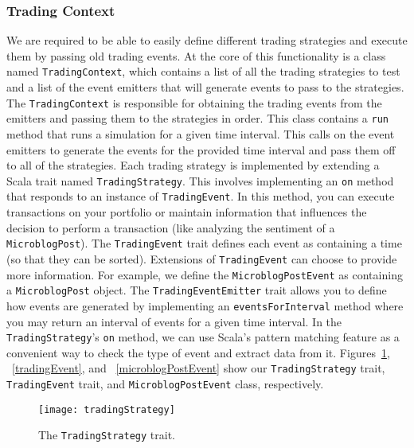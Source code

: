 \subsubsection{Trading Context}

We are required to be able to easily define different trading strategies and execute them by passing old trading events. At the core of this functionality is a class named \texttt{TradingContext}, which contains a list of all the trading strategies to test and a list of the event emitters that will generate events to pass to the strategies. The \texttt{TradingContext} is responsible for obtaining the trading events from the emitters and passing them to the strategies in order. This class contains a \texttt{run} method that runs a simulation for a given time interval. This calls on the event emitters to generate the events for the provided time interval and pass them off to all of the strategies. Each trading strategy is implemented by extending a Scala trait named \texttt{TradingStrategy}. This involves implementing an \texttt{on} method that responds to an instance of \texttt{TradingEvent}. In this method, you can execute transactions on your portfolio or maintain information that influences the decision to perform a transaction (like analyzing the sentiment of a \texttt{MicroblogPost}). The \texttt{TradingEvent} trait defines each event as containing a time (so that they can be sorted). Extensions of \texttt{TradingEvent} can choose to provide more information. For example, we define the \texttt{MicroblogPostEvent} as containing a \texttt{MicroblogPost} object. The \texttt{TradingEventEmitter} trait allows you to define how events are generated by implementing an \texttt{eventsForInterval} method where you may return an interval of events for a given time interval. In the \texttt{TradingStrategy}'s \texttt{on} method, we can use Scala's pattern matching feature as a convenient way to check the type of event and extract data from it. Figures~\ref{tradingStrategy}, ~\ref{tradingEvent}, and ~\ref{microblogPostEvent} show our \texttt{TradingStrategy} trait, \texttt{TradingEvent} trait, and \texttt{MicroblogPostEvent} class, respectively.

\begin{figure}[h]
  \label{tradingStrategy}
  \begin{center}
    \texttt{[image: tradingStrategy]}
  \end{center}
  \caption{The \texttt{TradingStrategy} trait.}
\end{figure}

